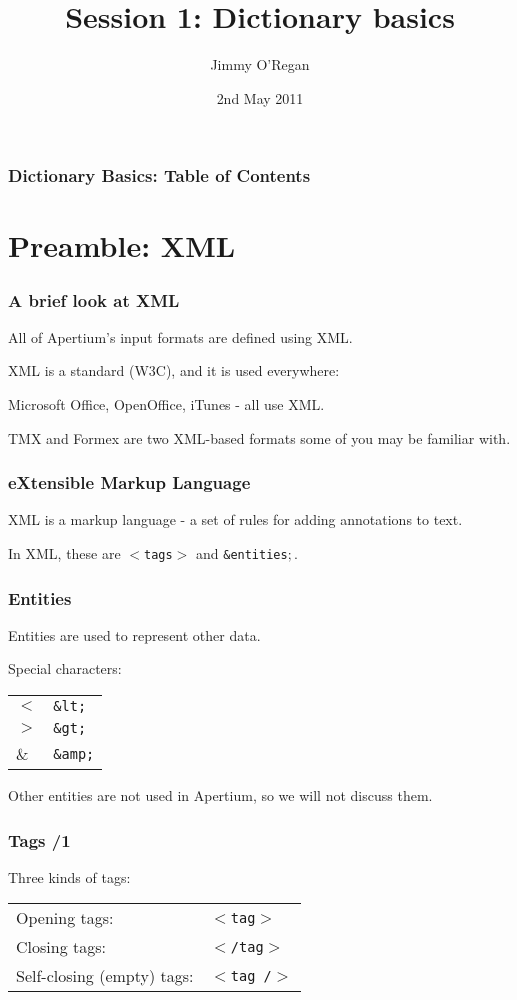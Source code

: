 \documentclass{beamer} %
\date{2nd May 2011}
\title{Session 1: Dictionary basics}
\author{Jimmy O'Regan}
\newcommand{\MyLogoBottomCentred}{
\begin{textblock}{14}(53.5,70)
  \pgfuseimage{logo}
\end{textblock}
}
\begin{document}
\frame{\titlepage \MyLogoBottomCentred}


\begin{frame}
  \frametitle{Dictionary Basics: Table of Contents}
  \tableofcontents
\end{frame}


\section{Preamble: XML}

\begin{frame}
  \frametitle{A brief look at XML}
  All of Apertium's input formats are defined using XML.

  XML is a standard (W3C), and it is used everywhere:

  Microsoft Office, OpenOffice, iTunes - all use XML.

  TMX and Formex are two XML-based formats some of you may be familiar with.
\end{frame}

\begin{frame}
  \frametitle{eXtensible Markup Language}

  XML is a markup language - a set of rules for adding annotations to text.

  In XML, these are {\tt $<$tags$>$} and {\tt \&entities$;$}.

\end{frame}

\begin{frame}
  \frametitle{Entities}

  Entities are used to represent other data.

  \begin{exampleblock}{Special characters:}
    \begin{tabular}{ll}
      $<$ & {\tt \&lt;} \\
      $>$ & {\tt \&gt;} \\
      \& & {\tt \&amp;}
    \end{tabular}
  \end{exampleblock}

  Other entities are not used in Apertium, so we will not discuss them.

\end{frame}

\begin{frame}
  \frametitle{Tags /1}

  \begin{exampleblock}{Three kinds of tags:}
    \begin{tabular}{ll}
      Opening tags: & {\tt $<$tag$>$} \\
      Closing tags: & {\tt $<$/tag$>$} \\
      Self-closing (empty) tags: & {\tt $<$tag /$>$}
    \end{tabular}
  \end{exampleblock}

\end{frame}
\end{document}
